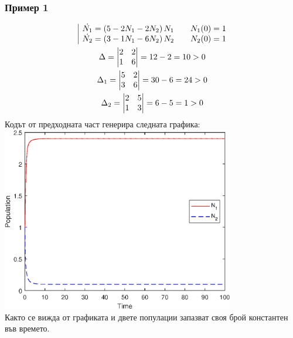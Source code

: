 \documentclass[a4paper,fleqn,12pt]{article}
\begin{document}
\subsubsection*{Пример 1}
\begin{gather*}
	\begin{array}{|l@{}}
	\dot{N_1} = \left(5 - 2N_1 - 2 N_2 \right) N_1 \qquad N_1(0) = 1\\
	\dot{N_2} = \left(3 - 1N_1 - 6 N_2 \right) N_2  \qquad N_2(0) = 1
	\end{array} \\
	\Delta = \begin{vmatrix} 2 & 2 \\ 1 & 6 \end{vmatrix} = 12 - 2 = 10 > 0 \\
	\Delta_1 = \begin{vmatrix}5 & 2 \\ 3 & 6 \end{vmatrix} = 30 - 6 = 24 > 0 \\
	\Delta_2 = \begin{vmatrix}2 & 5\\ 1 & 3 \end{vmatrix} = 6-5 = 1 > 0
\end{gather*}
Кодът от предходната част генерира следната графика: \\
\includegraphics [width=4in]{ecologyComp_01.eps} \\
Както се вижда от графиката и двете популации запазват своя брой константен във времето. \\
\end{document}

